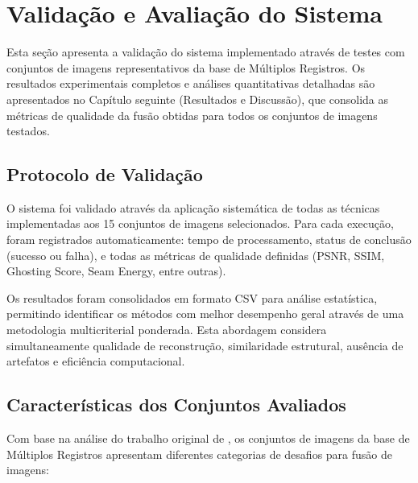 \section{Validação e Avaliação do Sistema}

Esta seção apresenta a validação do sistema implementado através de testes com conjuntos de imagens representativos da base de Múltiplos Registros. Os resultados experimentais completos e análises quantitativas detalhadas são apresentados no Capítulo seguinte (Resultados e Discussão), que consolida as métricas de qualidade da fusão obtidas para todos os conjuntos de imagens testados.

\subsection{Protocolo de Validação}

O sistema foi validado através da aplicação sistemática de todas as técnicas implementadas aos 15 conjuntos de imagens selecionados. Para cada execução, foram registrados automaticamente: tempo de processamento, status de conclusão (sucesso ou falha), e todas as métricas de qualidade definidas (PSNR, SSIM, Ghosting Score, Seam Energy, entre outras).

Os resultados foram consolidados em formato CSV para análise estatística, permitindo identificar os métodos com melhor desempenho geral através de uma metodologia multicriterial ponderada. Esta abordagem considera simultaneamente qualidade de reconstrução, similaridade estrutural, ausência de artefatos e eficiência computacional.

\subsection{Características dos Conjuntos Avaliados}

Com base na análise do trabalho original de \cite{zhang2018robust}, os conjuntos de imagens da base de Múltiplos Registros apresentam diferentes categorias de desafios para fusão de imagens:

